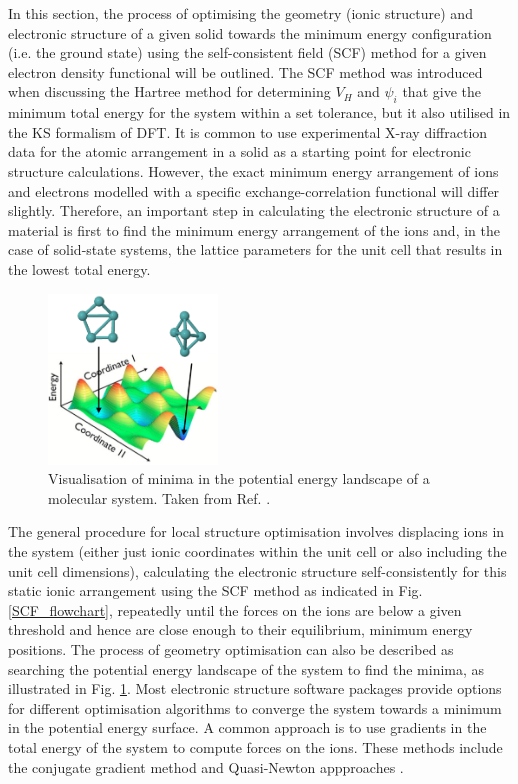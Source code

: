 \documentclass[11pt, twoside]{report}
\begin{document}
In this section, the process of optimising the geometry (ionic structure) and electronic structure of a given solid towards the minimum energy configuration (i.e. the ground state) using the self-consistent field (SCF) method for a given electron density functional will be outlined. The SCF method was introduced when discussing the Hartree method for determining $V_H$ and $\psi_i$ that give the minimum total energy for the system within a set tolerance, but it also utilised in the KS formalism of DFT. It is common to use experimental X-ray diffraction data for the atomic arrangement in a solid as a starting point for electronic structure calculations. However, the exact minimum energy arrangement of ions and electrons modelled with a specific exchange-correlation functional will differ slightly. Therefore, an important step in calculating the electronic structure of a material is first to find the minimum energy arrangement of the ions and, in the case of solid-state systems, the lattice parameters for the unit cell that results in the lowest total energy.
\begin{figure}[h!]
  \centering
    \includegraphics[width=0.4\textwidth]{figures/PE_landscape}
    \caption[Visualisation of minima in the potential energy landscape of a molecular system.]{Visualisation of minima in the potential energy landscape of a molecular system. Taken from Ref. .}
  \label{PE_landscape}
\end{figure}

The general procedure for local structure optimisation involves displacing ions in the system (either just ionic coordinates within the unit cell or also including the unit cell dimensions), calculating the electronic structure self-consistently for this static ionic arrangement using the SCF method as indicated in Fig. \ref{SCF_flowchart}, repeatedly until the forces on the ions are below a given threshold and hence are close enough to their equilibrium, minimum energy positions. The process of geometry optimisation can also be described as searching the potential energy landscape of the system to find the minima, as illustrated in Fig. \ref{PE_landscape}. Most electronic structure software packages provide options for different optimisation algorithms to converge the system towards a minimum in the potential energy surface. A common approach is to use gradients in the total energy of the system to compute forces on the ions. These methods include the conjugate gradient method and Quasi-Newton appproaches \cite{FHI-aims_slides_Lange}.
\end{document}
